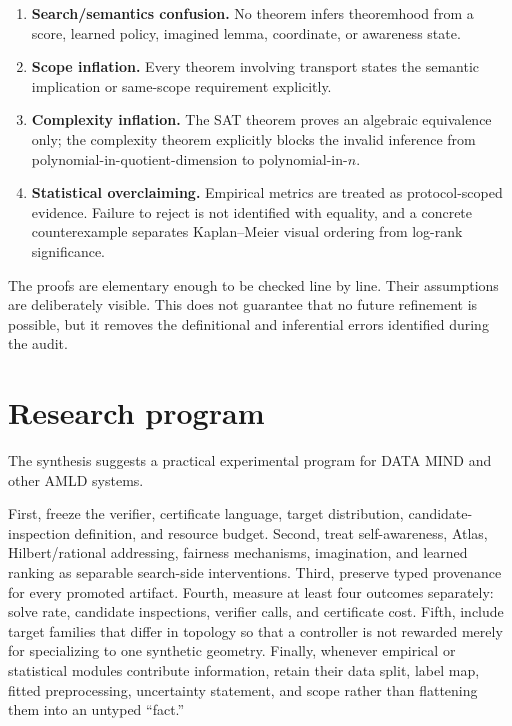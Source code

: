 \documentclass[11pt]{article}
\theoremstyle{special}
\theoremstyle{definition}
\begin{document}
\begin{enumerate}[leftmargin=2em]
\item \textbf{Search/semantics confusion.} No theorem infers theoremhood from a score, learned policy, imagined lemma, coordinate, or awareness state.
\item \textbf{Scope inflation.} Every theorem involving transport states the semantic implication or same-scope requirement explicitly.
\item \textbf{Complexity inflation.} The SAT theorem proves an algebraic equivalence only; the complexity theorem explicitly blocks the invalid inference from polynomial-in-quotient-dimension to polynomial-in-$n$.
\item \textbf{Statistical overclaiming.} Empirical metrics are treated as protocol-scoped evidence. Failure to reject is not identified with equality, and a concrete counterexample separates Kaplan--Meier visual ordering from log-rank significance.
\end{enumerate}

The proofs are elementary enough to be checked line by line. Their assumptions are deliberately visible. This does not guarantee that no future refinement is possible, but it removes the definitional and inferential errors identified during the audit.

\section{Research program}

The synthesis suggests a practical experimental program for DATA MIND and other AMLD systems.

First, freeze the verifier, certificate language, target distribution, candidate-inspection definition, and resource budget. Second, treat self-awareness, Atlas, Hilbert/rational addressing, fairness mechanisms, imagination, and learned ranking as separable search-side interventions. Third, preserve typed provenance for every promoted artifact. Fourth, measure at least four outcomes separately: solve rate, candidate inspections, verifier calls, and certificate cost. Fifth, include target families that differ in topology so that a controller is not rewarded merely for specializing to one synthetic geometry. Finally, whenever empirical or statistical modules contribute information, retain their data split, label map, fitted preprocessing, uncertainty statement, and scope rather than flattening them into an untyped ``fact.''
\end{document}
